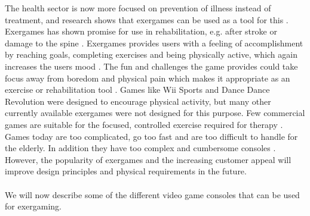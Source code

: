 The health sector is now more focused on prevention of illness instead of treatment, and research shows that exergames can be used as a tool for this  \cite{gamingforhealth}. Exergames has shown promise for use in rehabilitation, e.g. after stroke or damage to the spine \cite{lange2011development}. Exergames provides users with a feeling of accomplishment by reaching goals, completing exercises and being physically active, which again increases the users mood \cite{staiano2011exergames}. The fun and challenges the game provides could take focus away from boredom and physical pain which makes it appropriate as an exercise or rehabilitation tool \cite{roleofvideogames} \cite{exergamesforelderly}. Games like Wii Sports and Dance Dance Revolution were designed to encourage physical activity, but many other currently available exergames were not designed for this purpose. Few commercial games are suitable for the focused, controlled exercise required for therapy \cite{lange2011development}. Games today are too complicated, go too fast and are too difficult to handle for the elderly. In addition they have too complex and cumbersome consoles \cite{exergamesforelderly}. However, the popularity of exergames and the increasing customer appeal will improve design principles and physical requirements in the future\cite{chamberlin2008exergames}. \\ \\
We will now describe some of the different video game consoles that can be used for exergaming.

